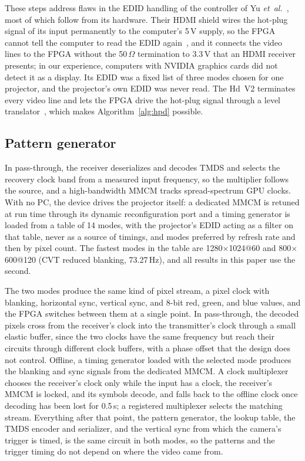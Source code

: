 \documentclass[10pt,journal,compsoc]{IEEEtran}
\newcommand{\SI}[2]{#1\,#2}
\newcommand{\second}{s}\newcommand{\hertz}{Hz}\newcommand{\metre}{m}
\newcommand{\ohm}{\ensuremath{\Omega}}
\begin{document}
These steps address flaws in the EDID handling of the controller of Yu
\emph{et~al.}~\cite{yu2019dualspie,yu2020dualprojector}, most of which follow from its hardware.
Their HDMI shield wires the hot-plug signal of its input permanently to the computer's
\SI{5}{V} supply, so the FPGA cannot tell the computer to read the EDID again~\cite{mojo_hdmi_sch},
and it connects the video lines to the FPGA without the \SI{50}{\ohm} termination to \SI{3.3}{V}
that an HDMI receiver presents; in our experience, computers with NVIDIA graphics cards did not
detect it as a display. Its EDID was a fixed list of three modes chosen for one projector, and the
projector's own EDID was never read. The Hd~V2 terminates every video line and lets the FPGA drive
the hot-plug signal through a level translator~\cite{alchitry_hd_sch}, which makes
Algorithm~\ref{alg:hpd} possible.

\subsection{Pattern generator}
\label{sec:pattern}
In pass-through, the receiver deserializes and decodes TMDS and selects the recovery clock band
from a measured input frequency, so the multiplier follows the source, and a high-bandwidth MMCM
tracks spread-spectrum GPU clocks. With no PC, the device drives the projector itself: a dedicated
MMCM is retuned at run time through its dynamic reconfiguration port and a timing generator is
loaded from a table of 14 modes, with the projector's EDID acting as a filter on that table, never
as a source of timings, and modes preferred by refresh rate and then by pixel count. The fastest
modes in the table are 1280$\times$1024@60 and 800$\times$600@120 (CVT reduced blanking,
\SI{73.27}{\mega\hertz}), and all results in this paper use the second.

The two modes produce the same kind of pixel stream, a pixel clock with blanking, horizontal sync,
vertical sync, and 8-bit red, green, and blue values, and the FPGA switches between them at a
single point. In pass-through, the decoded pixels cross from the receiver's clock into the
transmitter's clock through a small elastic buffer, since the two clocks have the same frequency
but reach their circuits through different clock buffers, with a phase offset that the design
does not control. Offline, a timing generator loaded with the selected mode produces the
blanking and sync signals from the dedicated MMCM. A clock multiplexer chooses the receiver's clock
only while the input has a clock, the receiver's MMCM is locked, and its symbols decode, and falls
back to the offline clock once decoding has been lost for \SI{0.5}{\second}; a registered
multiplexer selects the matching stream. Everything after that point, the pattern generator, the
lookup table, the TMDS encoder and serializer, and the vertical sync from which the camera's
trigger is timed, is the same circuit in both modes, so the patterns and the trigger timing do not
depend on where the video came from.
\end{document}
